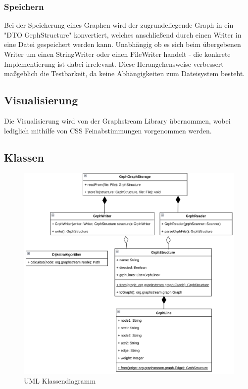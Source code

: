 \subsubsection{Speichern}
Bei der Speicherung eines Graphen wird der zugrundeliegende Graph in ein "DTO GrphStructure" konvertiert, welches anschließend durch einen Writer in eine Datei gespeichert werden kann. Unabhängig ob es sich beim übergebenen Writer um einen StringWriter oder einen FileWriter handelt - die konkrete Implementierung ist dabei irrelevant. Diese Herangehensweise verbessert maßgeblich die Testbarkeit, da keine Abhängigkeiten zum Dateisystem besteht.

\subsection{Visualisierung}
Die Visualisierung wird von der Graphstream Library übernommen, wobei lediglich mithilfe von CSS Feinabstimmungen vorgenommen werden.

\clearpage
\subsection{Klassen}
\begin{figure}[h!]
    \centering
    \includegraphics[scale=0.20]{Figs/Klassendiagramm.png}
    \caption{UML Klassendiagramm}
    \label{fig:enter-label}
\end{figure}

